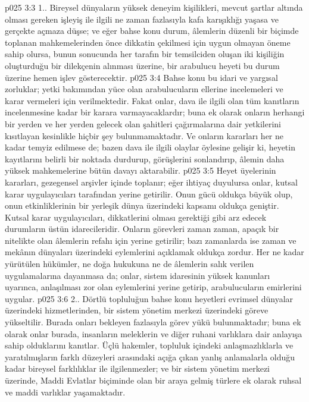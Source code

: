 \vs p025 3:3 1.\bibnobreakspace {}. Bireysel dünyaların yüksek deneyim kişilikleri, mevcut şartlar altında olması gereken işleyiş ile ilgili ne zaman fazlasıyla kafa karışıklığı yaşasa ve gerçekte açmaza düşse; ve eğer bahse konu durum, âlemlerin düzenli bir biçimde toplanan mahkemelerinden önce dikkatin çekilmesi için uygun olmayan öneme sahip olursa, bunun sonucunda her tarafın bir temsilciden oluşan iki kişiliğin oluşturduğu bir dilekçenin alınması üzerine, bir arabulucu heyeti bu durum üzerine hemen işlev gösterecektir.
\vs p025 3:4 Bahse konu bu idari ve yargısal zorluklar; yetki bakımından yüce olan arabulucuların ellerine incelemeleri ve karar vermeleri için verilmektedir. Fakat onlar, dava ile ilgili olan tüm kanıtların incelenmesine kadar bir karara varmayacaklardır; buna ek olarak onların herhangi bir yerden ve her yerden gelecek olan şahitleri çağırmalarına dair yetkilerini kısıtlayan kesinlikle hiçbir şey bulunmamaktadır. Ve onların kararları her ne kadar temyiz edilmese de; bazen dava ile ilgili olaylar öylesine gelişir ki, heyetin kayıtlarını belirli bir noktada durdurup, görüşlerini sonlandırıp, âlemin daha yüksek mahkemelerine bütün davayı aktarabilir.
\vs p025 3:5 Heyet üyelerinin kararları, gezegensel arşivler içinde toplanır; eğer ihtiyaç duyulursa onlar, kutsal karar uygulayıcıları tarafından yerine getirilir. Onun gücü oldukça büyük olup, onun etkinliklerinin bir yerleşik dünya üzerindeki kapsamı oldukça geniştir. Kutsal karar uygulayıcıları, dikkatlerini olması gerektiği gibi arz edecek durumların üstün idarecileridir. Onların görevleri zaman zaman, apaçık bir nitelikte olan âlemlerin refahı için yerine getirilir; bazı zamanlarda ise zaman ve mekânın dünyaları üzerindeki eylemlerini açıklamak oldukça zordur. Her ne kadar yürütülen hükümler, ne doğa hukukuna ne de âlemlerin salık verilen uygulamalarına dayanmasa da; onlar, sistem idaresinin yüksek kanunları uyarınca, anlaşılması zor olan eylemlerini yerine getirip, arabulucuların emirlerini uygular.
\vs p025 3:6 2.. Dörtlü topluluğun bahse konu heyetleri evrimsel dünyalar üzerindeki hizmetlerinden, bir sistem yönetim merkezi üzerindeki göreve yükseltilir. Burada onları bekleyen fazlasıyla görev yükü bulunmaktadır; buna ek olarak onlar burada, insanların meleklerin ve diğer ruhani varlıklara dair anlayışa sahip olduklarını kanıtlar. Üçlü hakemler, topluluk içindeki anlaşmazlıklarla ve yaratılmışların farklı düzeyleri arasındaki açığa çıkan yanlış anlamalarla olduğu kadar bireysel farklılıklar ile ilgilenmezler; ve bir sistem yönetim merkezi üzerinde, Maddi Evlatlar biçiminde olan bir araya gelmiş türlere ek olarak ruhsal ve maddi varlıklar yaşamaktadır.
